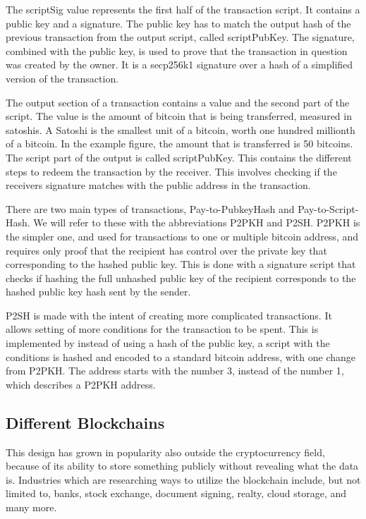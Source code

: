 \documentclass[11pt]{article}
\begin{document}
 The scriptSig value represents the first half of the transaction script. It contains a public key and a signature. The public key has to match the output hash of the previous transaction from the output script, called scriptPubKey. The signature, combined with the public key, is used to prove that the transaction in question was created by the owner. It is a secp256k1 signature over a hash of a simplified version of the transaction. 

The output section of a transaction contains a value and the second part of the script. The value is the amount of bitcoin that is being transferred, measured in satoshis. A Satoshi is the smallest unit of a bitcoin, worth one hundred millionth of a bitcoin. In the example figure, the amount that is transferred is 50 bitcoins. The script part of the output is called scriptPubKey. This contains the different steps to redeem the transaction by the receiver. This involves checking if the receivers signature matches with the public address in the transaction. 

There are two main types of transactions, Pay-to-PubkeyHash and Pay-to-Script-Hash. We will refer to these with the abbreviations P2PKH and P2SH. P2PKH is the simpler one, and used for transactions to one or multiple bitcoin address, and requires only proof that the recipient has control over the private key that corresponding to the hashed public key. This is done with a signature script that checks if hashing the full unhashed public key of the recipient corresponds to the hashed public key hash sent by the sender.

P2SH is made with the intent of creating more complicated transactions. It allows setting of more conditions for the transaction to be spent. This is implemented by instead of using a hash of the public key, a script with the conditions is hashed and encoded to a standard bitcoin address, with one change from P2PKH. The address starts with the number 3, instead of the number 1, which describes a P2PKH address. 
\subsection{Different Blockchains}

This design has grown in popularity also outside the cryptocurrency field, because of its ability to store something publicly without revealing what the data is. Industries which are researching ways to utilize the blockchain include, but not limited to, banks, stock exchange, document signing, realty, cloud storage, and many more. 
\end{document}
